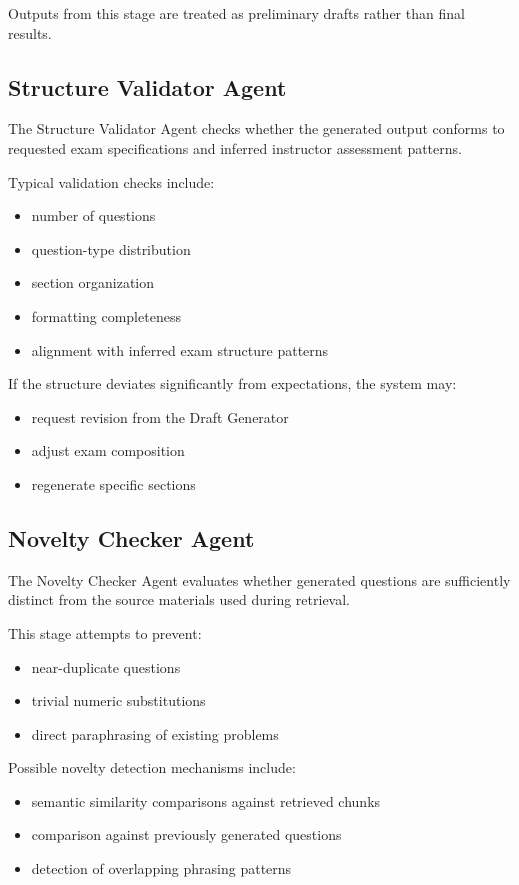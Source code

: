 \documentclass[11pt]{article}
\begin{document}
Outputs from this stage are treated as preliminary drafts rather than final results.

\subsection{Structure Validator Agent}
The Structure Validator Agent checks whether the generated output conforms to requested exam specifications and inferred instructor assessment patterns.

Typical validation checks include:

\begin{itemize}
\item number of questions
\item question-type distribution
\item section organization
\item formatting completeness
\item alignment with inferred exam structure patterns
\end{itemize}

If the structure deviates significantly from expectations, the system may:

\begin{itemize}
\item request revision from the Draft Generator
\item adjust exam composition
\item regenerate specific sections
\end{itemize}

\subsection{Novelty Checker Agent}
The Novelty Checker Agent evaluates whether generated questions are sufficiently distinct from the source materials used during retrieval.

This stage attempts to prevent:

\begin{itemize}
\item near-duplicate questions
\item trivial numeric substitutions
\item direct paraphrasing of existing problems
\end{itemize}

Possible novelty detection mechanisms include:

\begin{itemize}
\item semantic similarity comparisons against retrieved chunks
\item comparison against previously generated questions
\item detection of overlapping phrasing patterns
\end{itemize}
\end{document}
